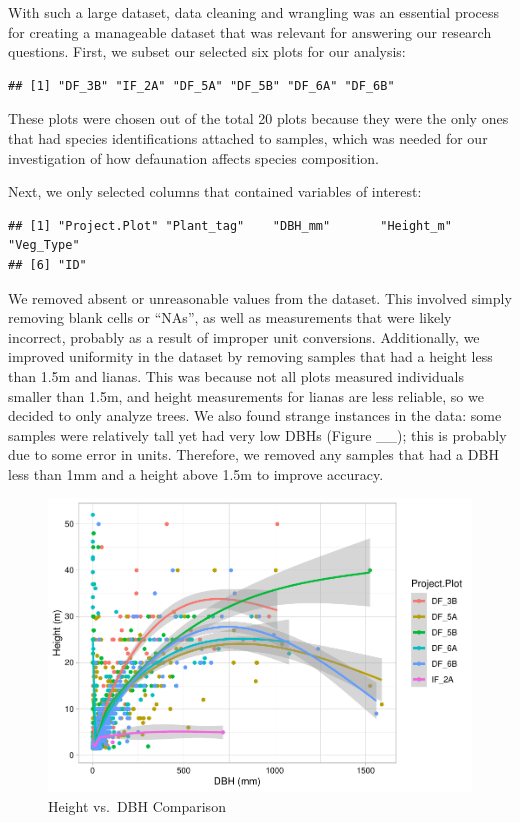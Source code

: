 \documentclass[
  12pt,
]{article}
\begin{document}
With such a large dataset, data cleaning and wrangling was an essential
process for creating a manageable dataset that was relevant for
answering our research questions. First, we subset our selected six
plots for our analysis:

\begin{verbatim}
## [1] "DF_3B" "IF_2A" "DF_5A" "DF_5B" "DF_6A" "DF_6B"
\end{verbatim}

These plots were chosen out of the total 20 plots because they were the
only ones that had species identifications attached to samples, which
was needed for our investigation of how defaunation affects species
composition.

Next, we only selected columns that contained variables of interest:

\begin{verbatim}
## [1] "Project.Plot" "Plant_tag"    "DBH_mm"       "Height_m"     "Veg_Type"    
## [6] "ID"
\end{verbatim}

We removed absent or unreasonable values from the dataset. This involved
simply removing blank cells or ``NAs'', as well as measurements that
were likely incorrect, probably as a result of improper unit
conversions. Additionally, we improved uniformity in the dataset by
removing samples that had a height less than 1.5m and lianas. This was
because not all plots measured individuals smaller than 1.5m, and height
measurements for lianas are less reliable, so we decided to only analyze
trees. We also found strange instances in the data: some samples were
relatively tall yet had very low DBHs (Figure \_\_); this is probably
due to some error in units. Therefore, we removed any samples that had a
DBH less than 1mm and a height above 1.5m to improve accuracy.

\begin{figure}
\centering
\includegraphics{GoldenGriffithsKnierMalinowski_ENV872_Project_files/figure-latex/plot of DBH vs height-1.pdf}
\caption{Height vs.~DBH Comparison}
\end{figure}
\end{document}
